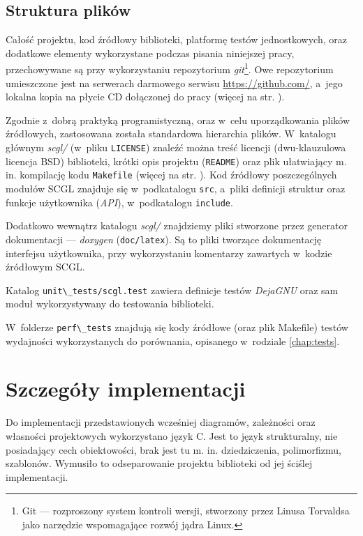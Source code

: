\documentclass[a4paper,12pt,polish,oneside,openright]{thesis}
\newcommand\code[1]{\lstinline[style=line]{#1}}
\begin{document}
\subsection{Struktura plików}
Całość projektu, kod źródłowy biblioteki, platformę testów jednostkowych, oraz dodatkowe elementy wykorzystane podczas pisania niniejszej pracy, przechowywane są przy wykorzystaniu repozytorium \emph{git}\footnote{Git --- rozproszony system kontroli wersji, stworzony przez Linusa Torvaldsa jako narzędzie wspomagające rozwój jądra Linux.}.
Owe repozytorium umieszczone jest na serwerach darmowego serwisu \url{https://github.com/}, a~jego lokalna kopia na płycie CD dołączonej do pracy (więcej na str. \pageref{chap:cd}).

Zgodnie z~dobrą praktyką programistyczną, oraz w~celu uporządkowania plików źródłowych, zastosowana została standardowa hierarchia plików.
W~katalogu głównym \emph{scgl/} (w~pliku \code{LICENSE}) znaleźć można treść licencji (dwu-klauzulowa licencja BSD) biblioteki, krótki opis projektu (\code{README}) oraz plik ułatwiający m. in. kompilację kodu \code{Makefile} (więcej na str. \pageref{chap:make}).
Kod źródłowy poszczególnych modułów SCGL znajduje się w~podkatalogu \code{src}, a~pliki definicji struktur oraz funkcje użytkownika (\emph{API}), w~podkatalogu \code{include}.

Dodatkowo wewnątrz katalogu \emph{scgl/} znajdziemy pliki stworzone przez generator dokumentacji ---  \emph{doxygen} (\code{doc/latex}).
Są to pliki tworzące dokumentację interfejsu użytkownika, przy wykorzystaniu komentarzy zawartych w~kodzie źródłowym SCGL.

Katalog \code{unit\_tests/scgl.test} zawiera definicje testów \emph{DejaGNU} oraz sam moduł wykorzystywany do testowania biblioteki.

W~folderze \code{perf\_tests} znajdują się kody źródłowe (oraz plik Makefile) testów wydajności wykorzystanych do porównania, opisanego w~rodziale \ref{chap:tests}.


\section{Szczegóły implementacji}
Do implementacji przedstawionych wcześniej diagramów, zależności oraz własności projektowych wykorzystano język C.
Jest to język strukturalny, nie posiadający cech obiektowości, brak jest tu m. in. dziedziczenia, polimorfizmu, szablonów.
Wymusiło to odseparowanie projektu biblioteki od jej ściślej implementacji.
\end{document}
